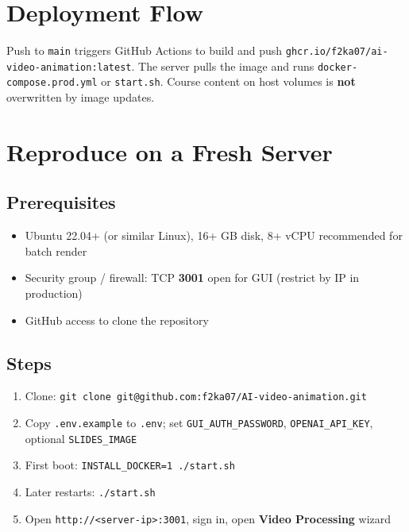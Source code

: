 \documentclass{scinexus}
\begin{document}
\section{Deployment Flow}

\diagramDeployFlow

Push to \texttt{main} triggers GitHub Actions to build and push \texttt{ghcr.io/f2ka07/ai-video-animation:latest}. The server pulls the image and runs \texttt{docker-compose.prod.yml} or \texttt{start.sh}. Course content on host volumes is \textbf{not} overwritten by image updates.

\section{Reproduce on a Fresh Server}

\diagramBootstrap

\subsection{Prerequisites}

\begin{itemize}
	\item Ubuntu 22.04+ (or similar Linux), 16+ GB disk, 8+ vCPU recommended for batch render
	\item Security group / firewall: TCP \textbf{3001} open for GUI (restrict by IP in production)
	\item GitHub access to clone the repository
\end{itemize}

\subsection{Steps}

\begin{enumerate}
	\item Clone: \texttt{git clone git@github.com:f2ka07/AI-video-animation.git}
	\item Copy \texttt{.env.example} to \texttt{.env}; set \texttt{GUI\_AUTH\_PASSWORD}, \texttt{OPENAI\_API\_KEY}, optional \texttt{SLIDES\_IMAGE}
	\item First boot: \texttt{INSTALL\_DOCKER=1 ./start.sh}
	\item Later restarts: \texttt{./start.sh}
	\item Open \texttt{http://<server-ip>:3001}, sign in, open \textbf{Video Processing} wizard
\end{enumerate}
\end{document}
